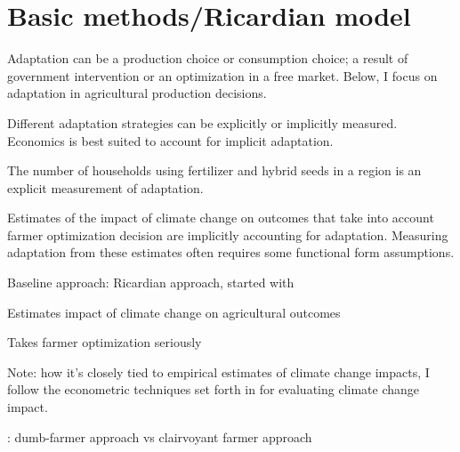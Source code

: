 \documentclass[10 pt]{article}
\begin{document}
\section{Basic methods/Ricardian model}

\begin{blist}

\item Adaptation can be a production choice or consumption choice; a result of government intervention or an optimization in a free market. 
Below, I focus on adaptation in agricultural production decisions. 

\item {} Different adaptation strategies can be explicitly or implicitly measured. 
Economics is best suited to account for implicit adaptation. %

\begin{blist}

\item The number of households using fertilizer and hybrid seeds in a region is an explicit measurement of adaptation.

\item Estimates of the impact of climate change on outcomes that take into account farmer optimization decision are implicitly accounting for adaptation. 
Measuring adaptation from these estimates often requires some functional form assumptions.

\end{blist}

\item Baseline approach: Ricardian approach, started with \textcite{MNS94} 

\begin{blist}

\item Estimates impact of climate change on agricultural outcomes

\item Takes farmer optimization seriously

\end{blist}

\item Note: how it's closely tied to empirical estimates of climate change impacts, I follow the econometric techniques set forth in \textcite{H16} for evaluating climate change impact.



\item \textcite{SEM00}: dumb-farmer approach vs clairvoyant farmer approach

\end{blist}
\end{document}
